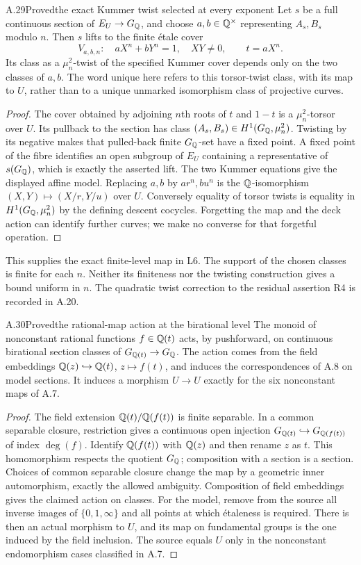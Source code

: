 \begin{statement}{A.29}{Proved}{the exact Kummer twist selected at every exponent}
Let $s$ be a full continuous section of $E_U\to G_\mathbb Q$, and choose
$a,b\in\mathbb Q^\times$ representing $A_s,B_s$ modulo $n$.
Then $s$ lifts to the finite étale cover
\[
 V_{a,b,n}:\quad aX^n+bY^n=1,\quad XY\ne0,
 \qquad t=aX^n.
\]
Its class as a $\mu_n^2$-twist of the specified Kummer cover depends
only on the two classes of $a,b$. The word unique here refers to this
torsor-twist class, with its map to $U$, rather than to a unique
unmarked isomorphism class of projective curves.
\end{statement}
\begin{proof}
The cover obtained by adjoining $n$th roots of $t$ and $1-t$ is a
$\mu_n^2$-torsor over $U$. Its pullback to the section has class
$(A_s,B_s)\in H^1(G_\mathbb Q,\mu_n^2)$. Twisting by its negative makes
that pulled-back finite $G_\mathbb Q$-set have a fixed point. A fixed point
of the fibre identifies an open subgroup of $E_U$ containing a
representative of $s(G_\mathbb Q)$, which is exactly the asserted lift.
The two Kummer equations give the displayed affine model. Replacing
$a,b$ by $a r^n,b u^n$ is the $\mathbb Q$-isomorphism
$(X,Y)\mapsto(X/r,Y/u)$ over $U$. Conversely equality of torsor
twists is equality in $H^1(G_\mathbb Q,\mu_n^2)$ by the defining descent
cocycles. Forgetting the map and the deck action can identify further
curves; we make no converse for that forgetful operation.
\end{proof}
This supplies the exact finite-level map in L6. The support of the
chosen classes is finite for each $n$. Neither its finiteness nor the
twisting construction gives a bound uniform in $n$. The quadratic
twist correction to the residual assertion R4 is recorded in A.20.

\begin{statement}{A.30}{Proved}{the rational-map action at the birational level}
The monoid of nonconstant rational functions $f\in\mathbb Q(t)$ acts, by
pushforward, on continuous birational section classes of
$G_{\mathbb Q(t)}\to G_\mathbb Q$. The action comes from the field embeddings
$\mathbb Q(z)\hookrightarrow\mathbb Q(t)$, $z\mapsto f(t)$, and induces the
correspondences of A.8 on model sections. It induces a morphism
$U\to U$ exactly for the six nonconstant maps of A.7.
\end{statement}
\begin{proof}
The field extension $\mathbb Q(t)/\mathbb Q(f(t))$ is finite separable. In a common
separable closure, restriction gives a continuous open injection
$G_{\mathbb Q(t)}\hookrightarrow G_{\mathbb Q(f(t))}$ of index $\deg(f)$.
Identify $\mathbb Q(f(t))$ with $\mathbb Q(z)$ and then rename $z$ as $t$.
This homomorphism respects the quotient $G_\mathbb Q$; composition with a
section is a section. Choices of common separable closure change the
map by a geometric inner automorphism, exactly the allowed ambiguity.
Composition of field embeddings gives the claimed action on classes.
For the model, remove from the source all inverse images of
$\{0,1,\infty\}$ and all points at which étaleness is required.
There is then an actual morphism to $U$, and its map on fundamental
groups is the one induced by the field inclusion. The source equals
$U$ only in the nonconstant endomorphism cases classified in A.7.
\end{proof}

